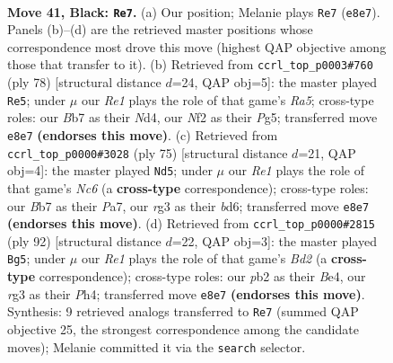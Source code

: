 \documentclass[11pt]{article}
\begin{document}
\clearpage

\begin{figure}[p]\centering
\begin{subfigure}{0.46\textwidth}\centering
\resizebox{\linewidth}{!}{%
\newchessgame
\chessboard[
  setfen={4r3/pb1p4/7B/5k2/2B5/6R1/PPK2n2/8 b - - 3 41},
  showmover=false,
  pgfstyle=straightmove, color=movearrow, markmove={e8-e7}
]}
\caption{}
\end{subfigure}\hfill
\begin{subfigure}{0.46\textwidth}\centering
\resizebox{\linewidth}{!}{%
\newchessgame
\chessboard[
  setfen={8/5kpp/8/R5P1/3NbP2/2r5/5K2/8 w - - 3 40},
  showmover=false,
  pgfstyle=straightmove, color=movearrow, markmove={a5-e5}
]}
\caption{}
\end{subfigure}
\\[4pt]
\begin{subfigure}{0.46\textwidth}\centering
\resizebox{\linewidth}{!}{%
\newchessgame
\chessboard[
  setfen={6k1/p2B1p2/2PB4/8/8/P1n2P2/6K1/4r3 b - - 0 38},
  showmover=false,
  pgfstyle=straightmove, color=movearrow, markmove={c3-d5}
]}
\caption{}
\end{subfigure}\hfill
\begin{subfigure}{0.46\textwidth}\centering
\resizebox{\linewidth}{!}{%
\newchessgame
\chessboard[
  setfen={8/5k2/b2b4/3Pp2p/4B2P/8/1P1B1K2/8 w - - 3 47},
  showmover=false,
  pgfstyle=straightmove, color=movearrow, markmove={d2-g5}
]}
\caption{}
\end{subfigure}
\caption{\textbf{Move 41, Black: \texttt{Re7}.} (a) Our position; Melanie plays \texttt{Re7} (\texttt{e8e7}). Panels (b)--(d) are the retrieved master positions whose correspondence most drove this move (highest QAP objective among those that transfer to it). (b) Retrieved from \texttt{ccrl\_top\_p0003\#760} (ply 78) [structural distance $d$=24, QAP obj=5]: the master played \texttt{Re5}; under $\mu$ our \emph{Re1} plays the role of that game's \emph{Ra5}; cross-type roles: our \emph{B}b7 as their \emph{N}d4, our \emph{N}f2 as their \emph{P}g5; transferred move \texttt{e8e7} \textbf{(endorses this move)}. (c) Retrieved from \texttt{ccrl\_top\_p0000\#3028} (ply 75) [structural distance $d$=21, QAP obj=4]: the master played \texttt{Nd5}; under $\mu$ our \emph{Re1} plays the role of that game's \emph{Nc6} (a \textbf{cross-type} correspondence); cross-type roles: our \emph{B}b7 as their \emph{P}a7, our \emph{r}g3 as their \emph{b}d6; transferred move \texttt{e8e7} \textbf{(endorses this move)}. (d) Retrieved from \texttt{ccrl\_top\_p0000\#2815} (ply 92) [structural distance $d$=22, QAP obj=3]: the master played \texttt{Bg5}; under $\mu$ our \emph{Re1} plays the role of that game's \emph{Bd2} (a \textbf{cross-type} correspondence); cross-type roles: our \emph{p}b2 as their \emph{B}e4, our \emph{r}g3 as their \emph{P}h4; transferred move \texttt{e8e7} \textbf{(endorses this move)}. Synthesis: 9 retrieved analogs transferred to \texttt{Re7} (summed QAP objective 25, the strongest correspondence among the candidate moves); Melanie committed it via the \texttt{search} selector.}
\label{fig:thought-m81}
\end{figure}
\end{document}

